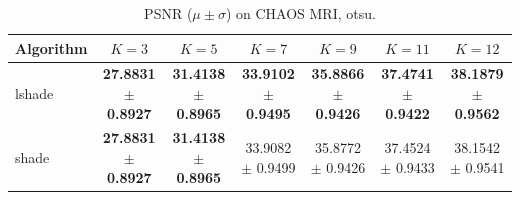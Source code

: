 \begin{table}[htbp]
\centering
\caption{PSNR ($\mu \pm \sigma$) on CHAOS MRI, otsu.}
\label{tab:exp2-otsu-psnr}
\begin{tabular}{lcccccc}
\toprule
Algorithm & $K=3$ & $K=5$ & $K=7$ & $K=9$ & $K=11$ & $K=12$ \\
\midrule
lshade & \textbf{27.8831 $\pm$ 0.8927} & \textbf{31.4138 $\pm$ 0.8965} & \textbf{33.9102 $\pm$ 0.9495} & \textbf{35.8866 $\pm$ 0.9426} & \textbf{37.4741 $\pm$ 0.9422} & \textbf{38.1879 $\pm$ 0.9562} \\
shade & \textbf{27.8831 $\pm$ 0.8927} & \textbf{31.4138 $\pm$ 0.8965} & 33.9082 $\pm$ 0.9499 & 35.8772 $\pm$ 0.9426 & 37.4524 $\pm$ 0.9433 & 38.1542 $\pm$ 0.9541 \\
\bottomrule
\end{tabular}
\end{table}